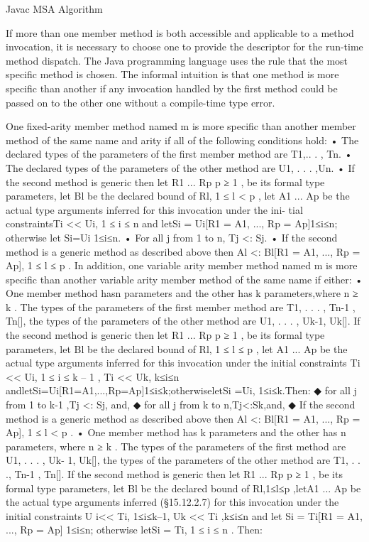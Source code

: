 Javac MSA Algorithm

If more than one member method is both accessible and applicable to a method invocation, it is necessary to choose one to provide the descriptor for the run-time method dispatch. The Java programming language uses the rule that the most specific method is chosen.
The informal intuition is that one method is more specific than another if any invocation handled by the first method could be passed on to the other one without a compile-time type error.

One fixed-arity member method named m is more specific than another member method of the same name and arity if all of the following conditions hold:
• The declared types of the parameters of the first member method are T1,.. . , Tn.
• The declared types of the parameters of the other method are U1, . . . ,Un.
• If the second method is generic then let R1 ... Rp p ≥ 1 , be its formal type parameters, let Bl be the declared bound of Rl, 1 ≤ l < p , let A1 ... Ap be the actual type arguments inferred for this invocation under the ini- tial constraintsTi << Ui, 1 ≤ i ≤ n and letSi = Ui[R1 = A1, ..., Rp = Ap]1≤i≤n; otherwise let Si=Ui 1≤i≤n.
• For all j from 1 to n, Tj <: Sj.
• If the second method is a generic method as described above then Al <: Bl[R1 = A1, ..., Rp = Ap], 1 ≤ l ≤ p .
In addition, one variable arity member method named m is more specific than another variable arity member method of the same name if either:
• One member method hasn parameters and the other has k parameters,where n ≥ k . The types of the parameters of the first member method are T1, . . . , Tn-1 , Tn[], the types of the parameters of the other method are U1, . . . , Uk-1, Uk[]. If the second method is generic then let R1 ... Rp p ≥ 1 , be its formal type parameters, let Bl be the declared bound of Rl, 1 ≤ l ≤ p , let A1 ... Ap be the actual type arguments inferred for this invocation under the initial constraints Ti << Ui, 1 ≤ i ≤ k – 1 , Ti << Uk, k≤i≤n andletSi=Ui[R1=A1,...,Rp=Ap]1≤i≤k;otherwiseletSi
=Ui, 1≤i≤k.Then:
◆ for all j from 1 to k-1 ,Tj <: Sj, and,
◆ for all j from k to n,Tj<:Sk,and,
◆ If the second method is a generic method as described above then Al <: Bl[R1 = A1, ..., Rp = Ap], 1 ≤ l < p .
• One member method has k parameters and the other has n parameters, where n ≥ k . The types of the parameters of the first method are U1, . . . , Uk- 1, Uk[], the types of the parameters of the other method are T1, . . ., Tn-1 , Tn[]. If the second method is generic then let R1 ... Rp p ≥ 1 , be its formal type parameters, let Bl be the declared bound of Rl,1≤l≤p ,letA1 ... Ap be the actual type arguments inferred (§15.12.2.7) for this invocation under the initial constraints U i<< Ti, 1≤i≤k–1, Uk << Ti ,k≤i≤n and let Si = Ti[R1 = A1, ..., Rp = Ap] 1≤i≤n; otherwise letSi = Ti, 1 ≤ i ≤ n . Then:
